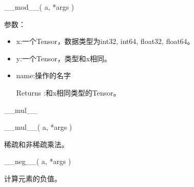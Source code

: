 \begin{python}
__mod__(
    a,
    *args
)
\end{python}
参数：

\begin{itemize}
	\item x:一个Tensor，数据类型为int32, int64, float32, float64。
	\item y:一个Tensor，类型和x相同。
	\item name:操作的名字
	\item[Returns]:和x相同类型的Tensor。
\end{itemize}
\_\_mul\_\_\newline
\begin{python}
__mul__(
    a,
    *args
)
\end{python}
稀疏和非稀疏乘法。
\begin{python}
__neg__(
    a,
    *args
)
\end{python}
计算元素的负值。

